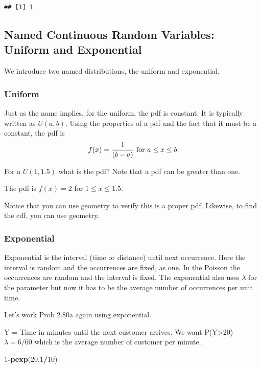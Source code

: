\documentclass[]{book}
\newenvironment{Shaded}{\begin{snugshade}}{\end{snugshade}}
\newcommand{\KeywordTok}[1]{\textcolor[rgb]{0.13,0.29,0.53}{\textbf{#1}}}
\newcommand{\DecValTok}[1]{\textcolor[rgb]{0.00,0.00,0.81}{#1}}
\newcommand{\OperatorTok}[1]{\textcolor[rgb]{0.81,0.36,0.00}{\textbf{#1}}}
\newcommand{\NormalTok}[1]{#1}
\theoremstyle{definition}
\theoremstyle{definition}
\theoremstyle{definition}
\theoremstyle{remark}
\begin{document}
\begin{verbatim}
## [1] 1
\end{verbatim}

\subsection{Named Continuous Random Variables: Uniform and
Exponential}\label{named-continuous-random-variables-uniform-and-exponential}

We introduce two named distributions, the uniform and exponential.

\subsubsection{Uniform}\label{uniform}

Just as the name implies, for the uniform, the pdf is constant. It is
typically written as \(U(a,b)\). Using the properties of a pdf and the
fact that it must be a constant, the pdf is
\[f(x)={1 \over (b-a)} \mbox{ for } a \leq x \leq b\]

For a \(U(1,1.5)\) what is the pdf? Note that a pdf can be greater than
one.

The pdf is \(f(x)=2\) for \(1 \leq x \leq 1.5\).

Notice that you can use geometry to verify this is a proper pdf.
Likewise, to find the cdf, you can use geometry.

\subsubsection{Exponential}\label{exponential}

Exponential is the interval (time or distance) until next occurrence.
Here the interval is random and the occurrences are fixed, as one. In
the Poisson the occurrences are random and the interval is fixed. The
exponential also uses \(\lambda\) for the parameter but now it has to be
the average number of occurrences per unit time.

Let's work Prob 2.80a again using exponential.

Y = Time in minutes until the next customer arrives. We want
P(Y\textgreater{}20) \(\lambda = 6/60\) which is the average number of
customer per minute.

\begin{Shaded}
\begin{Highlighting}[]
\DecValTok{1}\OperatorTok{-}\KeywordTok{pexp}\NormalTok{(}\DecValTok{20}\NormalTok{,}\DecValTok{1}\OperatorTok{/}\DecValTok{10}\NormalTok{)}
\end{Highlighting}
\end{Shaded}
\end{document}
